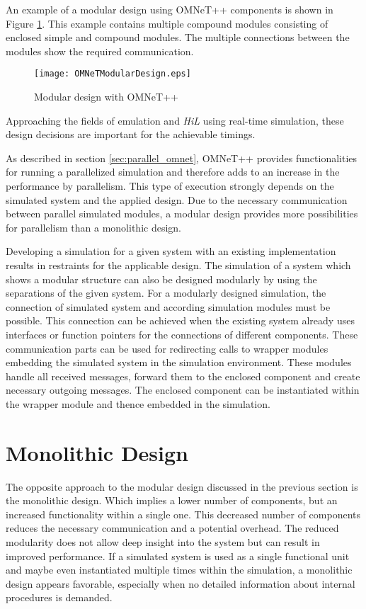 An example of a modular design using OMNeT++ components is shown in Figure \ref{fig:OMNeTModularDesign}.
This example contains multiple compound modules consisting of enclosed simple and compound modules.
The multiple connections between the modules show the required communication.

\begin{figure}
    \centering
    \texttt{[image: OMNeTModularDesign.eps]}
    \caption{Modular design with OMNeT++}
    \label{fig:OMNeTModularDesign}
\end{figure}

Approaching the fields of emulation and \emph{HiL} using real-time simulation, these design decisions are important for the achievable timings.

As described in section \ref{sec:parallel_omnet}, OMNeT++ provides functionalities for running a parallelized simulation and therefore adds to an increase in the performance by parallelism.
This type of execution strongly depends on the simulated system and the applied design.
Due to the necessary communication between parallel simulated modules, a modular design provides more possibilities for parallelism than a monolithic design.

Developing a simulation for a given system with an existing implementation results in restraints for the applicable design.
The simulation of a system which shows a modular structure can also be designed modularly by using the separations of the given system.
For a modularly designed simulation, the connection of simulated system and according simulation modules must be possible.
This connection can be achieved when the existing system already uses interfaces or function pointers for the connections of different components.
These communication parts can be used for redirecting calls to wrapper modules embedding the simulated system in the simulation environment.
These modules handle all received messages, forward them to the enclosed component and create necessary outgoing messages.
The enclosed component can be instantiated within the wrapper module and thence embedded in the simulation.

\section{Monolithic Design}
\label{sec:design_monolithic}
The opposite approach to the modular design discussed in the previous section is the monolithic design.
Which implies a lower number of components, but an increased functionality within a single one.
This decreased number of components reduces the necessary communication and a potential overhead.
The reduced modularity does not allow deep insight into the system but can result in improved performance.
If a simulated system is used as a single functional unit and maybe even instantiated multiple times within the simulation, a monolithic design appears favorable, especially when no detailed information about internal procedures is demanded.

